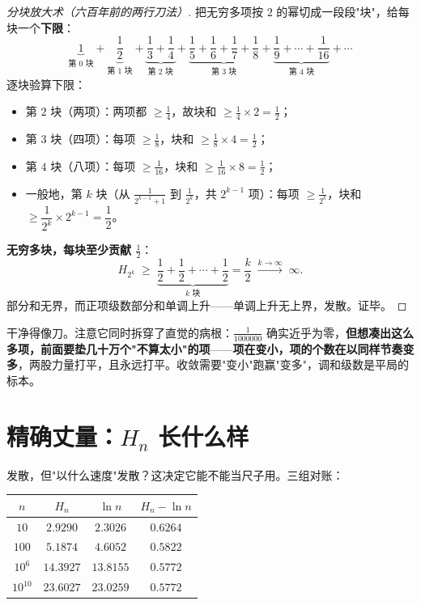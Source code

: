 \begin{proof}[分块放大术（六百年前的两行刀法）]
把无穷多项按 $2$ 的幂切成一段段"块"，给每块一个\textbf{下限}：
\[
\underbrace{1}_{\text{第 }0\text{ 块}} + \underbrace{\frac12}_{\text{第 }1\text{ 块}} + \underbrace{\frac13 + \frac14}_{\text{第 }2\text{ 块}} + \underbrace{\frac15 + \frac16 + \frac17 + \frac18}_{\text{第 }3\text{ 块}} + \underbrace{\frac19 + \cdots + \frac1{16}}_{\text{第 }4\text{ 块}} + \cdots
\]
逐块验算下限：
\begin{itemize}
\item 第 $2$ 块（两项）：两项都 $\ge \tfrac14$，故块和 $\ge \tfrac14\times2 = \tfrac12$；
\item 第 $3$ 块（四项）：每项 $\ge \tfrac18$，块和 $\ge \tfrac18\times4 = \tfrac12$；
\item 第 $4$ 块（八项）：每项 $\ge \tfrac1{16}$，块和 $\ge \tfrac1{16}\times8 = \tfrac12$；
\item 一般地，第 $k$ 块（从 $\tfrac{1}{2^{k-1}+1}$ 到 $\tfrac{1}{2^k}$，共 $2^{k-1}$ 项）：每项 $\ge \tfrac{1}{2^k}$，块和 $\ge \dfrac{1}{2^k}\times 2^{k-1} = \dfrac12$。
\end{itemize}
\textbf{无穷多块，每块至少贡献 $\tfrac12$}：
\[
H_{2^k} \;\ge\; \underbrace{\frac12 + \frac12 + \cdots + \frac12}_{k \text{ 块}} = \frac{k}{2} \;\xrightarrow{k\to\infty}\; \infty .
\]
部分和无界，而正项级数部分和单调上升——单调上升无上界，发散。证毕。
\end{proof}

干净得像刀。注意它同时拆穿了直觉的病根：$\tfrac1{1000000}$ 确实近乎为零，\textbf{但想凑出这么多项，前面要垫几十万个"不算太小"的项}——\textbf{项在变小，项的个数在以同样节奏变多}，两股力量打平，且永远打平。收敛需要"变小"跑赢"变多"，调和级数是平局的标本。

\section{精确丈量：$H_n$ 长什么样}

发散，但"以什么速度"发散？这决定它能不能当尺子用。三组对账：

\begin{center}
\begin{tabular}{cccc}
\toprule
$n$ & $H_n$ & $\ln n$ & $H_n - \ln n$ \\
\midrule
$10$ & $2.9290$ & $2.3026$ & $0.6264$ \\
$100$ & $5.1874$ & $4.6052$ & $0.5822$ \\
$10^6$ & $14.3927$ & $13.8155$ & $0.5772$ \\
$10^{10}$ & $23.6027$ & $23.0259$ & $0.5772$ \\
\bottomrule
\end{tabular}
\end{center}

